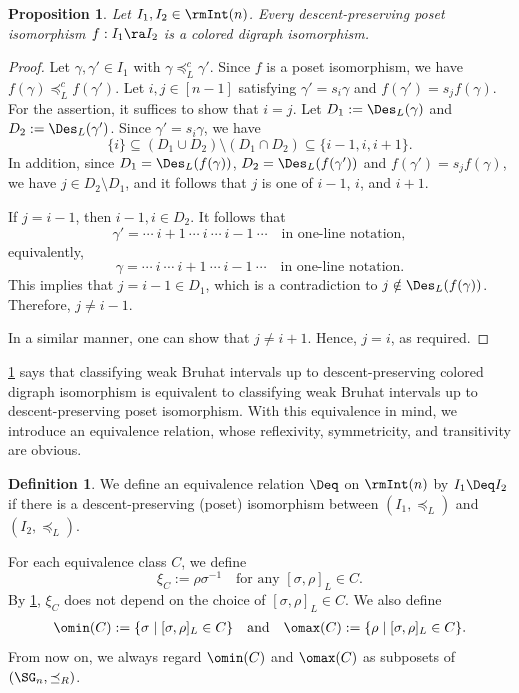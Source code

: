 \documentclass[12pt, reqno]{amsart}
\newtheorem{proposition}[theorem]{Proposition}
\theoremstyle{definition}
\newtheorem{definition}[theorem]{Definition}
\numberwithin{equation}{section} \numberwithin{figure}{section}
\numberwithin{table}{section}
\begin{document}
\begin{proposition}\label{Prop: desc pres isom and 0-Hecke}
Let $I_1, I_2 \in \rmInt(n)$. 
Every descent-preserving poset isomorphism $f: I_1 \ra I_2$ is a colored digraph isomorphism.
\end{proposition}




\begin{proof}
Let $\gamma, \gamma' \in I_1$ with $\gamma \preceq_L^c \gamma'$. 
Since $f$ is a poset isomorphism, we have
$f(\gamma) \preceq_L^c f(\gamma')$.
Let $i,j \in [n-1]$ satisfying $\gamma' = s_i \gamma$ and $f(\gamma') = s_j f(\gamma)$.
For the assertion, it suffices to show that $i = j$.
Let $D_1 := \Des_L(\gamma)$ and $D_2 := \Des_L(\gamma')$.
Since $\gamma' = s_i \gamma$, we have
\[
\{i\} \subseteq (D_1 \cup D_2) \setminus (D_1 \cap D_2) \subseteq \{i-1, i, i+1\}.
\]
In addition, since $D_1 = \Des_L(f(\gamma))$, $D_2 = \Des_L(f(\gamma'))$ and $f(\gamma') = s_j f(\gamma)$, we have $j \in D_2 \setminus D_1$, and it follows that $j$ is one of $i-1$, $i$, and $i+1$.

If $j = i-1$, then $i-1, i \in D_2$.
It follows that
\[
\gamma' = \cdots \  i+1 \ \cdots \ i \   \cdots \  i-1 \  \cdots 
\quad
\text{in one-line notation},
\]
equivalently,
\[
\gamma = \cdots \  i \ \cdots \  i+1 \   \cdots \  i-1  \ \cdots
\quad \text{in one-line notation.}
\]
This implies that $j=i-1 \in D_1$, which is a contradiction to $j \notin \Des_L(f(\gamma))$.
Therefore, $j\neq i-1$.

In a similar manner, one can show that $j \neq i+1$.
Hence, $j = i$, as required.
\end{proof}

\cref{Prop: desc pres isom and 0-Hecke} says that   classifying
weak Bruhat intervals up to descent-preserving colored digraph isomorphism
is equivalent to classifying 
weak Bruhat intervals up to descent-preserving poset isomorphism.
With this equivalence in mind, we introduce an equivalence relation, whose reflexivity, symmetricity, and transitivity are obvious.
\begin{definition}
We define an equivalence relation $\Deq$ on $\rmInt(n)$ by $I_1 \Deq I_2$ if there is a descent-preserving (poset) isomorphism between $(I_1, \preceq_L)$ and $(I_2, \preceq_L)$.
\end{definition}


For each equivalence class  $C$, we define 
\[
\xi_C := \rho \sigma^{-1} \quad \text{for any $[\sigma, \rho]_L \in C$.}
\]
By \cref{Prop: desc pres isom and 0-Hecke}, $\xi_C$ does not depend on the choice of $[\sigma, \rho]_L \in C$. 
We also define
\begin{align*}
\omin(C) := \{\sigma \mid [\sigma, \rho]_L \in C\} \quad \text{and} \quad \omax(C) := \{\rho \mid [\sigma, \rho]_L \in C \}.
\end{align*}
From now on, we always regard $\omin(C)$ and $\omax(C)$ as subposets of $(\SG_n, \preceq_R)$.
\end{document}
